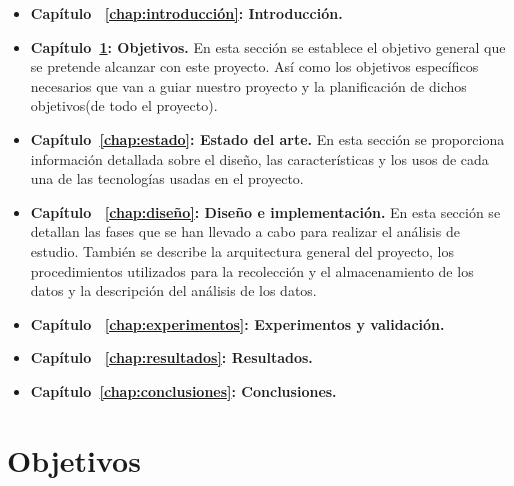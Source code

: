 \documentclass[a4paper, 12pt]{book}
\begin{document}
\begin{itemize}
  
  \item \textbf{Capítulo ~\ref{chap:introducción}: Introducción.} 

  \item \textbf{Capítulo~\ref{chap:objetivos}: Objetivos.} En esta sección se establece el objetivo general que se pretende alcanzar con este proyecto. 
  Así como los objetivos específicos necesarios que van a guiar nuestro proyecto y la planificación de dichos objetivos(de todo el proyecto). 
  
  \item \textbf{Capítulo~\ref{chap:estado}: Estado del arte.} En esta sección se proporciona información detallada sobre el diseño, las características y los usos de cada una de las tecnologías usadas en el proyecto.  
  
  \item \textbf{Capítulo ~\ref{chap:diseño}: Diseño e implementación.} En esta sección se detallan las fases que se han llevado a cabo para realizar el análisis de estudio. 
  También se describe la arquitectura general del proyecto, los procedimientos utilizados para la recolección y el almacenamiento de los datos y la descripción del análisis de los datos.

  \item \textbf{Capítulo ~\ref{chap:experimentos}: Experimentos y validación.}

  \item \textbf{Capítulo ~\ref{chap:resultados}: Resultados.}
 
  \item \textbf{Capítulo~\ref{chap:conclusiones}: Conclusiones.}
  
  
\end{itemize}



\cleardoublepage %
\chapter{Objetivos} %
\label{chap:objetivos} %
\end{document}
